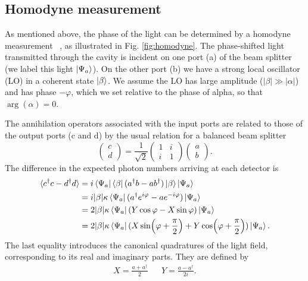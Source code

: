 \subsection{Homodyne measurement}

As mentioned above, the phase of the light can be determined by a homodyne
measurement ~\cite{agarwal2012}, as illustrated in Fig.  \ref{fig:homodyne}.
The phase-shifted light transmitted through the cavity is incident on one port
(a) of the beam splitter (we label this light $\ket{\Psi_a}$). On the other
port (b) we have a strong local oscillator (LO) in a coherent state
$\ket{\beta}$. We assume the LO has large amplitude ($|\beta|
\gg |\alpha|$) and has phase $-\varphi$, which we set relative to the phase of
alpha, so that $\arg(\alpha)=0$.

The annihilation operators associated with the input ports are related to those
of the output ports (c and d) by the usual relation for a balanced beam
splitter~\cite{agarwal2012}
%
\begin{equation}
  \begin{pmatrix} c \\ d \end{pmatrix} = \frac{1}{\sqrt{2}}\begin{pmatrix}
    1 & i \\ i & 1 
  \end{pmatrix}  \begin{pmatrix} a \\ b \end{pmatrix}.
\end{equation}
%
The difference in the expected photon numbers arriving at each
detector is
\begin{align}
  \langle c^\dagger c - d^\dagger d\rangle &= i
  \bra{\Psi_a}\bra{\beta}(a^\dagger b-
  ab^\dagger)\ket{\beta}\ket{\Psi_a} \\
  & = i|\beta|\kappa \bra{\Psi_a}(a^\dagger e^{i\varphi} - a
  e^{-i\varphi})\ket{\Psi_a} \\
  &= 2|\beta|\kappa\bra{\Psi_a}(Y\cos\varphi - X\sin\varphi)\ket{\Psi_a} \\
  &= 2|\beta|\kappa\bra{\Psi_a}(X\sin(\varphi+\frac{\pi}{2}) +
  Y\cos(\varphi+\frac{\pi}{2}))\ket{\Psi_a}.
  \label{squeeze:eqn:homoquads}
\end{align}
%
The last equality introduces the canonical quadratures of the light field,
corresponding to its real and imaginary parts. They are defined
by~\cite{gerry_knight_2004}
\begin{align}
  X = \frac{a + a^\dagger}{2} && Y = \frac{a - a^\dagger}{2i}.
\end{align}

